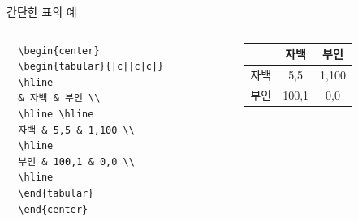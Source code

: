 \documentclass{beamer}
\begin{document}
\begin{frame}[fragile]
\begin{block}{간단한 표의 예}
\begin{columns}
\begin{column}{0.5\textwidth}
  \begin{verbatim}
  \begin{center}
  \begin{tabular}{|c||c|c|}
  \hline  
  & 자백 & 부인 \\
  \hline \hline
  자백 & 5,5 & 1,100 \\
  \hline 
  부인 & 100,1 & 0,0 \\
  \hline 
  \end{tabular}
  \end{center}
\end{verbatim}
\end{column}

\begin{column}{0.5\textwidth}
\begin{center}
\begin{tabular}{|c||c|c|}
\hline  
& 자백 & 부인 \\
\hline \hline
자백 & 5,5 & 1,100 \\
\hline 
부인 & 100,1 & 0,0 \\
\hline 
\end{tabular}
\end{center}
\end{column}


\end{columns}

\end{block}
\end{frame}

\end{document}
